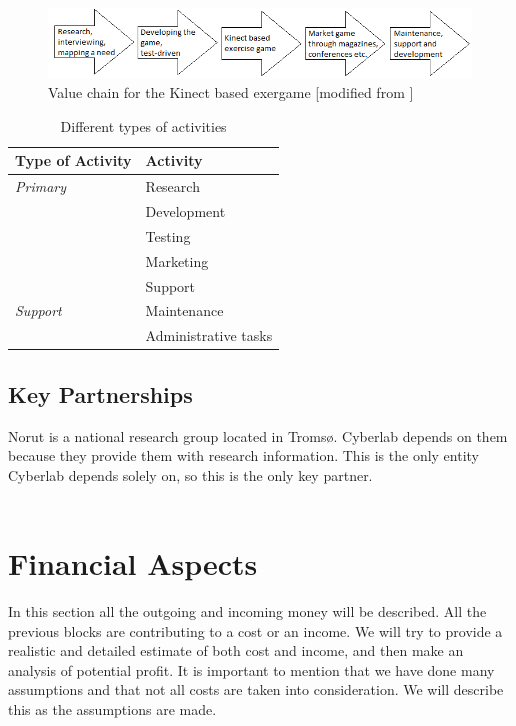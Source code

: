 \begin{figure}
\begin{center}
\includegraphics[scale=0.7]{valuechaincase}
\caption[Value Chain for the Kinect Based Exergame]{Value chain for the Kinect based exergame [modified from \cite{osterwalderthesis}]}
\label{fig:ValueChainCase}
\end{center}
\end{figure}

\begin{table}
\centering
    \begin{tabular}{|l|l|}
        \hline
        \textbf{Type of Activity} & \textbf{Activity} \\ \hline
        \emph{Primary} & Research \\ \cline{2-2}
        & Development \\ \cline{2-2}
	 	& Testing \\ \cline{2-2}
	 	& Marketing \\ \cline{2-2}
	 	& Support \\ \hline
	 	 \emph{Support} & Maintenance \\ \cline{2-2}
	   	& Administrative tasks \\
       \hline
    \end{tabular}
    \caption[Different types of activities ]{Different types of activities}
    \label{tab:activities}
\end{table}

\newpage

\subsection{Key Partnerships}

Norut is a national research group located in Tromsø. Cyberlab depends on them because they provide them with research information. This is the only entity Cyberlab depends solely on, so this is the only key partner. \\ \\ 

\section{Financial Aspects}
In this section all the outgoing and incoming money will be described. All the previous blocks are contributing to a cost or an income. We will try to provide a realistic and detailed estimate of both cost and income, and then make an analysis of potential profit. It is important to mention that we have done many assumptions and that not all costs are taken into consideration. We will describe this as the assumptions are made.

